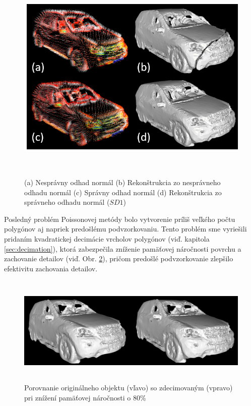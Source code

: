 \begin{figure}[ht]
  \centering
  \includegraphics[width=16cm, height=10.25cm]{img/mesh_bad_normals.png}
  \caption{(a) Nesprávny odhad normál (b) Rekonštrukcia zo nesprávneho odhadu normál (c) Správny odhad normál (d) Rekonštrukcia zo správneho odhadu normál ($SD1$)} 
  \label{fig:mesh_bad_normals}
\end{figure} 

\indent Posledný problém Poissonovej metódy bolo vytvorenie príliš veľkého počtu polygónov aj napriek predošlému podvzorkovaniu. Tento problém sme vyriešili pridaním kvadratickej decimácie vrcholov polygónov (viď. kapitola \ref{sec:decimation}), ktorá zabezpečila zníženie pamäťovej náročnosti povrchu a zachovanie detailov (viď. Obr. \ref{fig:decimation_results}), pričom predošlé podvzorkovanie zlepšilo efektivitu zachovania detailov.

\begin{figure}[!htbp]
  \centering
  \includegraphics[width=16cm, height=5.25cm]{img/decimation_results.png}
  \caption{Porovnanie originálneho objektu (vľavo) so zdecimovaným (vpravo) pri znížení pamäťovej náročnosti o 80\%} 
  \label{fig:decimation_results}
\end{figure} 

